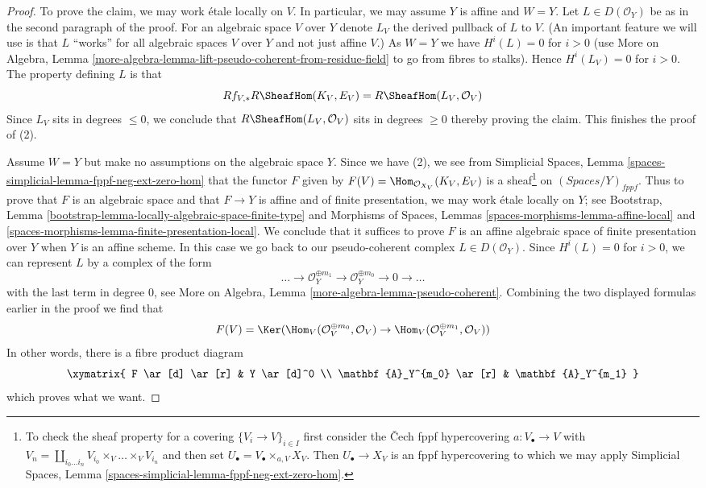 \begin{proof}
\medskip\noindent
To prove the claim, we may work \'etale locally on $V$.
In particular, we may assume $Y$ is affine and $W = Y$.
Let $L \in D(\mathcal{O}_Y)$ be as in the second paragraph of the proof.
For an algebraic space $V$ over $Y$ denote $L_V$ the derived pullback of
$L$ to $V$. (An important feature we will use is that $L$ ``works'' for all
algebraic spaces $V$ over $Y$ and not just affine $V$.)
As $W = Y$ we have $H^i(L) = 0$ for $i > 0$
(use More on Algebra, Lemma
\ref{more-algebra-lemma-lift-pseudo-coherent-from-residue-field}
to go from fibres to stalks). Hence $H^i(L_V) = 0$ for $i > 0$.
The property defining $L$ is that
$$
Rf_{V, *}R\SheafHom(K_V, E_V) = R\SheafHom(L_V, \mathcal{O}_V)
$$
Since $L_V$ sits in degrees $\leq 0$, we conclude that
$R\SheafHom(L_V, \mathcal{O}_V)$ sits in degrees $\geq 0$
thereby proving the claim. This finishes the proof of (2).

\medskip\noindent
Assume $W = Y$ but make no assumptions on the algebraic space $Y$.
Since we have (2), we see from
Simplicial Spaces, Lemma \ref{spaces-simplicial-lemma-fppf-neg-ext-zero-hom}
that the functor $F$ given by $F(V) = \Hom_{\mathcal{O}_{X_V}}(K_V, E_V)$
is a sheaf\footnote{To check the sheaf property
for a covering $\{V_i \to V\}_{i \in I}$ first consider the
{\v C}ech fppf hypercovering $a : V_\bullet \to V$ with
$V_n = \coprod_{i_0 \ldots i_n} V_{i_0} \times_V \ldots \times_V V_{i_n}$
and then set $U_\bullet = V_\bullet \times_{a, V} X_V$. Then
$U_\bullet \to X_V$ is an fppf hypercovering to which we may
apply Simplicial Spaces, Lemma
\ref{spaces-simplicial-lemma-fppf-neg-ext-zero-hom}.}
on $(\textit{Spaces}/Y)_{fppf}$. Thus to prove that $F$
is an algebraic space and that $F \to Y$ is affine and of
finite presentation, we may work \'etale locally on $Y$; see
Bootstrap, Lemma \ref{bootstrap-lemma-locally-algebraic-space-finite-type}
and
Morphisms of Spaces, Lemmas \ref{spaces-morphisms-lemma-affine-local} and
\ref{spaces-morphisms-lemma-finite-presentation-local}. We conclude
that it suffices to prove $F$ is an affine algebraic space of
finite presentation over $Y$ when $Y$ is an affine scheme. In this
case we go back to our pseudo-coherent complex $L \in D(\mathcal{O}_Y)$.
Since $H^i(L) = 0$ for $i > 0$, we can represent $L$ by a complex
of the form
$$
\ldots \to \mathcal{O}_Y^{\oplus m_1} \to \mathcal{O}_Y^{\oplus m_0}
\to 0 \to \ldots
$$
with the last term in degree $0$, see More on Algebra, Lemma
\ref{more-algebra-lemma-pseudo-coherent}. Combining the two displayed formulas
earlier in the proof we find that
$$
F(V) =
\Ker(
\Hom_V(\mathcal{O}_V^{\oplus m_0}, \mathcal{O}_V)
\to 
\Hom_V(\mathcal{O}_V^{\oplus m_1}, \mathcal{O}_V)
)
$$
In other words, there is a fibre product diagram
$$
\xymatrix{
F \ar[d] \ar[r] & Y \ar[d]^0 \\
\mathbf{A}_Y^{m_0} \ar[r] & \mathbf{A}_Y^{m_1}
}
$$
which proves what we want.
\end{proof}

